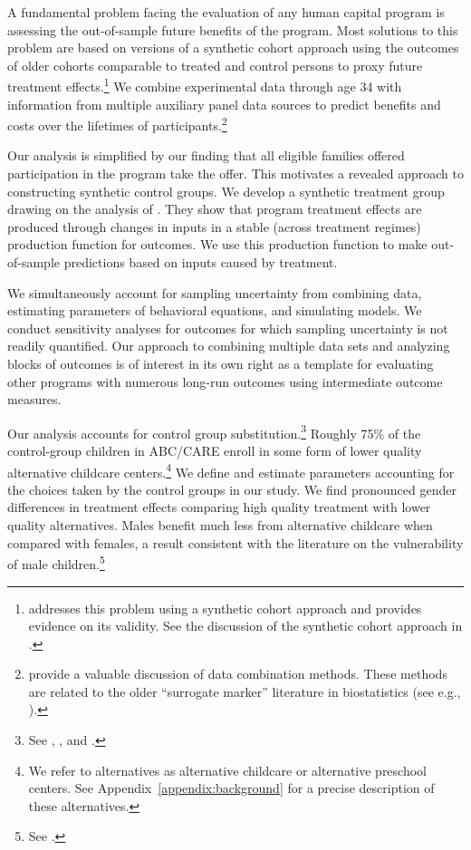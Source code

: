 A fundamental problem facing the evaluation of any human capital program is assessing the out-of-sample future benefits of the program. Most solutions to this problem are based on versions of a synthetic cohort approach using the outcomes of older cohorts comparable to treated and control persons to proxy future treatment effects.\footnote{\cite{Mincer_1974_schooling} addresses this problem using a synthetic cohort approach and provides evidence on its validity. See the discussion of the synthetic cohort approach in \cite{Heckman_Lochner_ea_2006_HEE}.} We combine experimental data through age 34 with information from multiple auxiliary panel data sources to predict benefits and costs over the lifetimes of participants.\footnote{\citet{Ridder_Moffitt_2007_hbk_metricsdata} provide a valuable discussion of data combination methods. These methods are related to the older ``surrogate marker'' literature in biostatistics (see e.g., \citealp{Prentice_1989_Surrogate_SiM}).}

Our analysis is simplified by our finding that all eligible families offered participation in the program take the offer. This motivates a revealed approach to constructing synthetic control groups. We develop a synthetic treatment group drawing on the analysis of \citet{Heckman_Pinto_etal_2013_PerryFactor}. They show that program treatment effects are produced through changes in inputs in a stable (across treatment regimes) production function for outcomes. We use this production function to make out-of-sample predictions based on inputs caused by treatment.

We simultaneously account for sampling uncertainty from combining data, estimating parameters of behavioral equations, and simulating models. We conduct sensitivity analyses for outcomes for which sampling uncertainty is not readily quantified. Our approach to combining multiple data sets and analyzing blocks of outcomes is of interest in its own right as a template for evaluating other programs with numerous long-run outcomes using intermediate outcome measures.

Our analysis accounts for control group substitution.\footnote{See \cite{Heckman_1992_randomization}, \cite{Heckman_Hohmann_etal_2000_QJE}, and \cite{Kline_Walters_2016_QJE}.} Roughly 75\% of the control-group children in ABC/CARE enroll in some form of lower quality alternative childcare centers.\footnote{We refer to alternatives as alternative childcare or alternative preschool centers. See Appendix~\ref{appendix:background} for a precise description of these alternatives.} We define and estimate parameters accounting for the choices taken by the control groups in our study. We find pronounced gender differences in treatment effects comparing high quality treatment with lower quality alternatives. Males benefit much less from alternative childcare when compared with females, a result consistent with the literature on the vulnerability of male children.\footnote{See \citet{Kottelenberg-Lehrer_2014_Gender-Effects,Autor-etal_2015_Family-Disadvantage,Baker_Gruber_Milligan_2015_Noncog_Defects}.}

